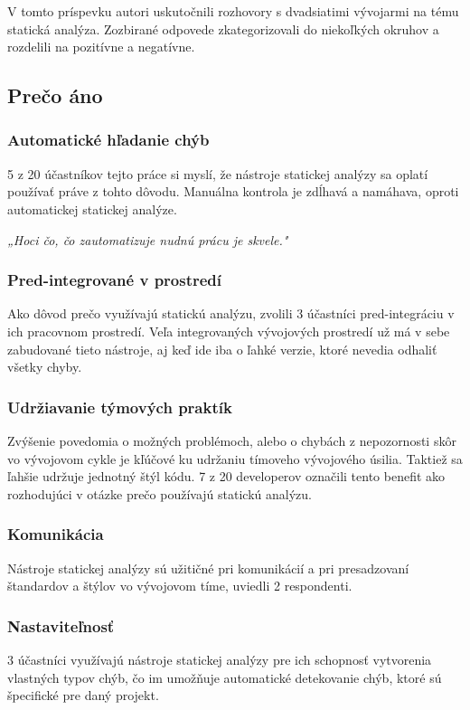 \documentclass[11pt,twoside,slovak,a4paper]{article}
\begin{document}
V tomto príspevku autori uskutočnili rozhovory s dvadsiatimi vývojarmi na tému statická analýza. Zozbirané odpovede
zkategorizovali do niekoľkých okruhov a rozdelili na pozitívne a negatívne.

\subsection{Prečo áno} \label{vyuzitie:benefity}
\subsubsection*{Automatické hľadanie chýb}
5 z 20 účastníkov tejto práce si myslí, že nástroje statickej analýzy sa oplatí používať práve z tohto dôvodu.
Manuálna kontrola je zdĺhavá a namáhava, oproti automatickej statickej analýze.

\emph{„Hoci čo, čo zautomatizuje nudnú prácu je skvele."}

\subsubsection*{Pred-integrované v prostredí}
Ako dôvod prečo využívajú statickú analýzu, zvolili 3 účastníci pred-integráciu v ich pracovnom prostredí. Veľa
integrovaných vývojových prostredí už má v sebe zabudované tieto nástroje, aj keď ide iba o ľahké verzie, ktoré nevedia
odhaliť všetky chyby.

\subsubsection*{Udržiavanie týmových praktík}
Zvýšenie povedomia o možných problémoch, alebo o chybách z nepozornosti skôr vo vývojovom cykle je kľúčové ku udržaniu
tímoveho vývojového úsilia. Taktiež sa ľahšie udržuje jednotný štýl kódu. 7 z 20 developerov označili tento benefit ako
rozhodujúci v otázke prečo používajú statickú analýzu.

\subsubsection*{Komunikácia}
Nástroje statickej analýzy sú užitičné pri komunikácií a pri presadzovaní štandardov a štýlov vo vývojovom tíme,
uviedli 2 respondenti.

\subsubsection*{Nastaviteľnosť}
3 účastníci využívajú nástroje statickej analýzy pre ich schopnosť vytvorenia vlastných typov chýb, čo im umožňuje
automatické detekovanie chýb, ktoré sú špecifické pre daný projekt.
\end{document}
